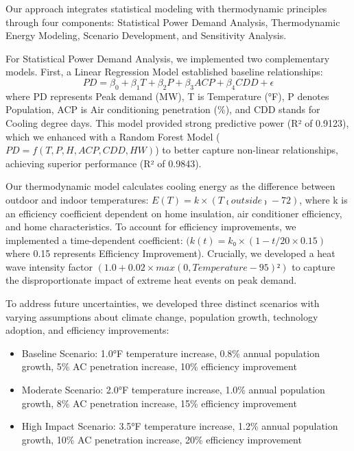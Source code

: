 \documentclass{article}
\begin{document}
Our approach integrates statistical modeling with thermodynamic principles through four components: Statistical Power Demand Analysis, Thermodynamic Energy Modeling, Scenario Development, and Sensitivity Analysis.

For Statistical Power Demand Analysis, we implemented two complementary models. First, a Linear Regression Model established baseline relationships: 
\begin{equation}
    PD = \beta_{0} + \beta_{1}T + \beta_{2}P + \beta_{3}ACP + \beta_{4}CDD + \epsilon
    \label{eq:linear_model}
\end{equation}
where PD represents Peak demand (MW), T is Temperature (°F), P denotes Population, ACP is Air conditioning penetration (\%), and CDD stands for Cooling degree days. This model provided strong predictive power (R² of 0.9123), which we enhanced with a Random Forest Model (\(PD = f(T, P, H, ACP, CDD, HW)\)) to better capture non-linear relationships, achieving superior performance (R² of 0.9843).

Our thermodynamic model calculates cooling energy as the difference between outdoor and indoor temperatures: \(E(T) = k × (T₍outside₎ - 72)\), where k is an efficiency coefficient dependent on home insulation, air conditioner efficiency, and home characteristics. To account for efficiency improvements, we implemented a time-dependent coefficient: \((k(t) = k₀ × (1 - t/20 ×  0.15)\) where 0.15 represents Efficiency Improvement). 
Crucially, we developed a heat wave intensity factor \((1.0 + 0.02 × max(0, Temperature - 95)²)\) to capture the disproportionate impact of extreme heat events on peak demand.

To address future uncertainties, we developed three distinct scenarios with varying assumptions about climate change, population growth, technology adoption, and efficiency improvements:

\begin{itemize}
    \item Baseline Scenario: 1.0°F temperature increase, 0.8\% annual population growth, 5\% AC penetration increase, 10\% efficiency improvement
    \item Moderate Scenario: 2.0°F temperature increase, 1.0\% annual population growth, 8\% AC penetration increase, 15\% efficiency improvement
    \item High Impact Scenario: 3.5°F temperature increase, 1.2\% annual population growth, 10\% AC penetration increase, 20\% efficiency improvement
\end{itemize}
\end{document}
